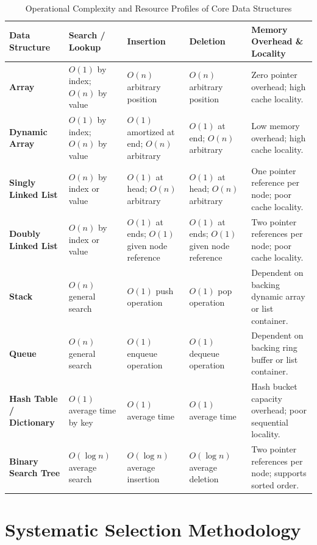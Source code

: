 \documentclass[12pt]{report}
\begin{document}
\begin{table}[htbp]
\centering
\caption{Operational Complexity and Resource Profiles of Core Data Structures}
\label{tab:ds_comparison}
\begin{tabularx}{\textwidth}{>{\raggedright\arraybackslash}p{2.5cm} X X X >{\raggedright\arraybackslash}p{2.8cm}}
\toprule
\textbf{Data Structure} & \textbf{Search / Lookup} & \textbf{Insertion} & \textbf{Deletion} & \textbf{Memory Overhead \& Locality} \\
\midrule
\textbf{Array} & $O(1)$ by index; $O(n)$ by value & $O(n)$ arbitrary position & $O(n)$ arbitrary position & Zero pointer overhead; high cache locality. \\
\midrule
\textbf{Dynamic Array} & $O(1)$ by index; $O(n)$ by value & $O(1)$ amortized at end; $O(n)$ arbitrary & $O(1)$ at end; $O(n)$ arbitrary & Low memory overhead; high cache locality. \\
\midrule
\textbf{Singly Linked List} & $O(n)$ by index or value & $O(1)$ at head; $O(n)$ arbitrary & $O(1)$ at head; $O(n)$ arbitrary & One pointer reference per node; poor cache locality. \\
\midrule
\textbf{Doubly Linked List} & $O(n)$ by index or value & $O(1)$ at ends; $O(1)$ given node reference & $O(1)$ at ends; $O(1)$ given node reference & Two pointer references per node; poor cache locality. \\
\midrule
\textbf{Stack} & $O(n)$ general search & $O(1)$ push operation & $O(1)$ pop operation & Dependent on backing dynamic array or list container. \\
\midrule
\textbf{Queue} & $O(n)$ general search & $O(1)$ enqueue operation & $O(1)$ dequeue operation & Dependent on backing ring buffer or list container. \\
\midrule
\textbf{Hash Table / Dictionary} & $O(1)$ average time by key & $O(1)$ average time & $O(1)$ average time & Hash bucket capacity overhead; poor sequential locality. \\
\midrule
\textbf{Binary Search Tree} & $O(\log n)$ average search & $O(\log n)$ average insertion & $O(\log n)$ average deletion & Two pointer references per node; supports sorted order. \\
\bottomrule
\end{tabularx}
\end{table}

\section{Systematic Selection Methodology}
\end{document}
